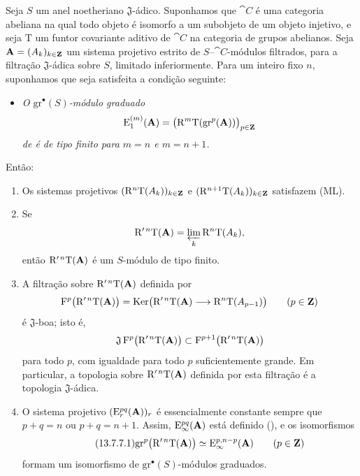 \begin{proposition}[13.7.7]
\label{0.13.7.7}
Seja $S$ um anel noetheriano $\mathfrak{J}$-ádico.
Suponhamos que $\cat{C}$ é uma categoria abeliana na qual todo objeto
é isomorfo a um subobjeto de um objeto injetivo, e seja
$\mathrm{T}$ um funtor covariante aditivo de $\cat{C}$ na
categoria de grupos abelianos.
Seja $\mathbf{A}=(A_k)_{k\in\mathbf{Z}}$ um
sistema projetivo estrito de $S$--$\cat{C}$-módulos filtrados, para a
filtração $\mathfrak{J}$-ádica sobre $S$, limitado inferiormente.
Para um inteiro fixo $n$, suponhamos que seja satisfeita a condição seguinte:
\begin{itemize}
  \item[$(\mathrm{F}_n)$]
  \emph{O $\mathrm{gr}^\bullet(S)$-módulo graduado}
  \[
    \mathrm{E}_1^{(m)}(\mathbf{A})
    =
    \bigl(
      \mathrm{R}^m\mathrm{T}(\mathrm{gr}^p(\mathbf{A}))
    \bigr)_{p\in\mathbf{Z}}
  \]
  \emph{de  é de tipo finito para
  $m=n$ e $m=n+1$.}
\end{itemize}
Então:
\begin{enumerate}
  \item[{\rm(i)}] Os sistemas projetivos
  $(\mathrm{R}^n\mathrm{T}(A_k))_{k\in\mathbf{Z}}$ e
  $(\mathrm{R}^{n+1}\mathrm{T}(A_k))_{k\in\mathbf{Z}}$ satisfazem {\rm(ML)}.
  \item[{\rm(ii)}] Se
  \[
    \mathrm{R}'^{\,n}\mathrm{T}(\mathbf{A})
    =
    \varprojlim_k\mathrm{R}^n\mathrm{T}(A_k),
  \]
  então $\mathrm{R}'^{\,n}\mathrm{T}(\mathbf{A})$ é um $S$-módulo de tipo
  finito.
  \item[{\rm(iii)}] A filtração sobre
  $\mathrm{R}'^{\,n}\mathrm{T}(\mathbf{A})$ definida por
  \[
    \mathrm{F}^p\bigl(\mathrm{R}'^{\,n}\mathrm{T}(\mathbf{A})\bigr)
    =
    \operatorname{Ker}\bigl(
      \mathrm{R}'^{\,n}\mathrm{T}(\mathbf{A})
      \longrightarrow
      \mathrm{R}^n\mathrm{T}(A_{p-1})
    \bigr)
    \qquad(p\in\mathbf{Z})
  \]
  é $\mathfrak{J}$-boa; isto é,
  \[
    \mathfrak{J}\,
    \mathrm{F}^p\bigl(\mathrm{R}'^{\,n}\mathrm{T}(\mathbf{A})\bigr)
    \subset
    \mathrm{F}^{p+1}\bigl(\mathrm{R}'^{\,n}\mathrm{T}(\mathbf{A})\bigr)
  \]
  para todo $p$, com igualdade para todo $p$ suficientemente grande.
  Em particular, a topologia sobre
  $\mathrm{R}'^{\,n}\mathrm{T}(\mathbf{A})$ definida por esta filtração é a
  topologia $\mathfrak{J}$-ádica.
  \item[{\rm(iv)}] O sistema projetivo
  $(\mathrm{E}_r^{pq}(\mathbf{A}))_r$ é essencialmente constante sempre que
  $p+q=n$ ou $p+q=n+1$.
  Assim, $\mathrm{E}_\infty^{pq}(\mathbf{A})$ está definido
  (), e os isomorfismos
  \begin{equation}
  \label{0.13.7.7.1}
  \tag{13.7.7.1}
    \mathrm{gr}^p\bigl(\RR'^{\,n}\mathrm{T}(\bb{A})\bigr)
    \isoto
    \mathrm{E}_\infty^{p,n-p}(\bb{A})
    \qquad(p\in\bb{Z})
  \end{equation}
  formam um isomorfismo de
  $\mathrm{gr}^\bullet(S)$-módulos graduados.
\end{enumerate}
\end{proposition}

